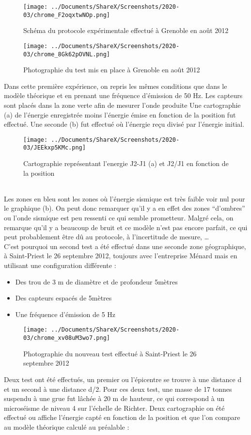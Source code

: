\documentclass[12pt,a4paper]{article}
\begin{document}
\begin{figure}[hbtp]
	\centering
	\texttt{[image: ../Documents/ShareX/Screenshots/2020-03/chrome\_F2oqxtwNOp.png]}
	\caption{Schéma du protocole expérimentale effectué à Grenoble en août 2012}
\end{figure}
\begin{figure}[h]
	\centering
	\texttt{[image: ../Documents/ShareX/Screenshots/2020-03/chrome\_8Gk62pOVNL.png]}
	\caption{Photographie du test mis en place à Grenoble en août 2012}
\end{figure} 
	Dans cette première expérience, on repris les mêmes conditions que dans le modèle théorique et en prenant une fréquence d’émission de 50 Hz.
Les capteurs sont placés dans la zone verte afin de mesurer l’onde produite
Une cartographie (a) de l'énergie enregistrée moins l'énergie émise en fonction de la position fut effectué. Une seconde (b) fut effectué où l'énergie reçu divisé par l'énergie initial.\\
\begin{figure}[hbtp]
	\centering
	\texttt{[image: ../Documents/ShareX/Screenshots/2020-03/JEEkxp5KMc.png]}
	\caption{Cartographie représentant l'energie J2-J1 (a) et J2/J1 en fonction de la position}
\end{figure}\\
	Les zones en bleu sont les zones où l'énergie sismique est très faible voir nul pour le graphique (b).
On peut donc remarquer qu’il y a en effet des zones “d’ombres” ou l’onde sismique est peu ressenti ce qui semble prometteur.
Malgré cela, on remarque qu’il y a beaucoup de bruit et ce modèle n’est pas encore parfait, ce qui peut probablement être dû au protocole, à l’incertitude de mesure, … \\

	C’est pourquoi un second test a été effectué dans une seconde zone géographique, à Saint-Priest le 26 septembre 2012, toujours avec l’entreprise Ménard mais en utilisant une configuration différente : \\
	\begin{itemize}
		\item Des trou de 3 m de diamètre et de profondeur 5mètres
		\item Des capteurs espacés de 5mètres
		\item Une fréquence d’émission de 5 Hz
	\end{itemize} 
	
\begin{figure}[hbtp]
\centering
\texttt{[image: ../Documents/ShareX/Screenshots/2020-03/chrome\_xv08uM3wo7.png]}
\caption{Photographie du nouveau test effectué à Saint-Priest le 26 septembre 2012}
\end{figure} 
	Deux test ont été effectués, un premier ou l’épicentre se trouve à une distance d et un second à une distance d/2. Pour ces deux test, une masse de 17 tonnes suspendu à une grue fut lâchée à 20 m de hauteur, ce qui correspond à un microséisme de niveau 4 sur l’échelle de Richter.
	Deux cartographie on été effectué ou affiche l'énergie capté en fonction de la position et que l’on compare au modèle théorique calculé au préalable :\\
	
\end{document}
